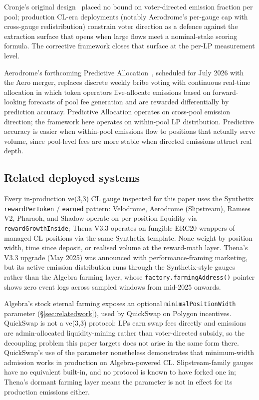 \documentclass[11pt,a4paper]{article}
\theoremstyle{cgdefinition}
\theoremstyle{cgplain}
\theoremstyle{cgremark}
\begin{document}
Cronje's original design~\cite{cronje2022} placed no bound on voter-directed emission fraction per pool; production CL-era deployments (notably Aerodrome's per-gauge cap with cross-gauge redistribution) constrain voter direction as a defence against the extraction surface that opens when large flows meet a nominal-stake scoring formula. The corrective framework closes that surface at the per-LP measurement level.

Aerodrome's forthcoming Predictive Allocation~\cite{aerodrome2026pa}, scheduled for July 2026 with the Aero merger, replaces discrete weekly bribe voting with continuous real-time allocation in which token operators live-allocate emissions based on forward-looking forecasts of pool fee generation and are rewarded differentially by prediction accuracy. Predictive Allocation operates on cross-pool emission direction; the framework here operates on within-pool LP distribution. Predictive accuracy is easier when within-pool emissions flow to positions that actually serve volume, since pool-level fees are more stable when directed emissions attract real depth.

\subsection{Related deployed systems}\label{sec:relatedsystems}

Every in-production ve(3,3) CL gauge inspected for this paper uses the Synthetix \texttt{rewardPerToken} / \texttt{earned} pattern: Velodrome, Aerodrome (Slipstream), Ramses V2, Pharaoh, and Shadow operate on per-position liquidity via \texttt{rewardGrowthInside}; Thena V3.3 operates on fungible ERC20 wrappers of managed CL positions via the same Synthetix template. None weight by position width, time since deposit, or realised volume at the reward-math layer. Thena's V3.3 upgrade (May 2025) was announced with performance-framing marketing, but its active emission distribution runs through the Synthetix-style gauges rather than the Algebra farming layer, whose \texttt{factory.farmingAddress()} pointer shows zero event logs across sampled windows from mid-2025 onwards.

Algebra's stock eternal farming exposes an optional \texttt{minimalPositionWidth} parameter (\S\ref{sec:relatedwork}), used by QuickSwap on Polygon incentives. QuickSwap is not a ve(3,3) protocol: LPs earn swap fees directly and emissions are admin-allocated liquidity-mining rather than voter-directed subsidy, so the decoupling problem this paper targets does not arise in the same form there. QuickSwap's use of the parameter nonetheless demonstrates that minimum-width admission works in production on Algebra-powered CL. Slipstream-family gauges have no equivalent built-in, and no protocol is known to have forked one in; Thena's dormant farming layer means the parameter is not in effect for its production emissions either.
\end{document}

